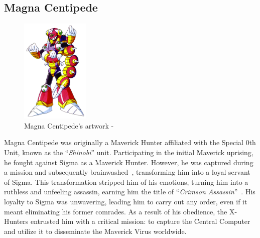 \subsection{Magna Centipede}\label{boss:Magna_centipede}
\begin{figure}[htp]
	\centering
	\includegraphics[height=5cm]{figures/X2/Magna_centipede/Magna_Centipede.png}
	\caption{Magna Centipede's artwork - \cite{book:MMX_Complete_art}}
\end{figure}
Magna Centipede was originally a Maverick Hunter affiliated with the Special 0th Unit, known as the ``\textit{Shinobi}'' unit. Participating in the initial Maverick uprising, he fought against Sigma as a Maverick Hunter. However, he was captured during a mission and subsequently brainwashed~\cite{wayback:X2_resources}, transforming him into a loyal servant of Sigma. This transformation stripped him of his emotions, turning him into a ruthless and unfeeling assassin, earning him the title of ``\textit{Crimson Assassin}''~\cite{book:MMX_Complete_art}. His loyalty to Sigma was unwavering, leading him to carry out any order, even if it meant eliminating his former comrades. As a result of his obedience, the X-Hunters entrusted him with a critical mission: to capture the Central Computer and utilize it to disseminate the Maverick Virus worldwide. 
